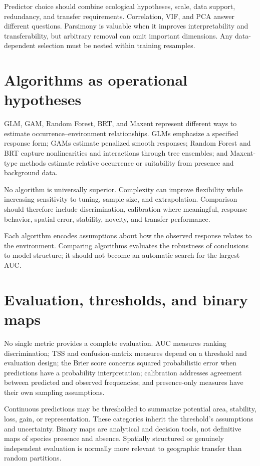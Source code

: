Predictor choice should combine ecological hypotheses, scale, data support, redundancy, and transfer requirements. Correlation, VIF, and PCA answer different questions. Parsimony is valuable when it improves interpretability and transferability, but arbitrary removal can omit important dimensions. Any data-dependent selection must be nested within training resamples.

\section{Algorithms as operational hypotheses}

GLM, GAM, Random Forest, BRT, and Maxent represent different ways to estimate occurrence--environment relationships. GLMs emphasize a specified response form; GAMs estimate penalized smooth responses; Random Forest and BRT capture nonlinearities and interactions through tree ensembles; and Maxent-type methods estimate relative occurrence or suitability from presence and background data.

No algorithm is universally superior. Complexity can improve flexibility while increasing sensitivity to tuning, sample size, and extrapolation. Comparison should therefore include discrimination, calibration where meaningful, response behavior, spatial error, stability, novelty, and transfer performance.

\begin{conceito}[title={\faBook\quad Algorithms as operational hypotheses}]
Each algorithm encodes assumptions about how the observed response relates to the environment. Comparing algorithms evaluates the robustness of conclusions to model structure; it should not become an automatic search for the largest AUC.
\end{conceito}

\section{Evaluation, thresholds, and binary maps}

No single metric provides a complete evaluation. AUC measures ranking discrimination; TSS and confusion-matrix measures depend on a threshold and evaluation design; the Brier score concerns squared probabilistic error when predictions have a probability interpretation; calibration addresses agreement between predicted and observed frequencies; and presence-only measures have their own sampling assumptions.

Continuous predictions may be thresholded to summarize potential area, stability, loss, gain, or representation. These categories inherit the threshold's assumptions and uncertainty. Binary maps are analytical and decision tools, not definitive maps of species presence and absence. Spatially structured or genuinely independent evaluation is normally more relevant to geographic transfer than random partitions.

